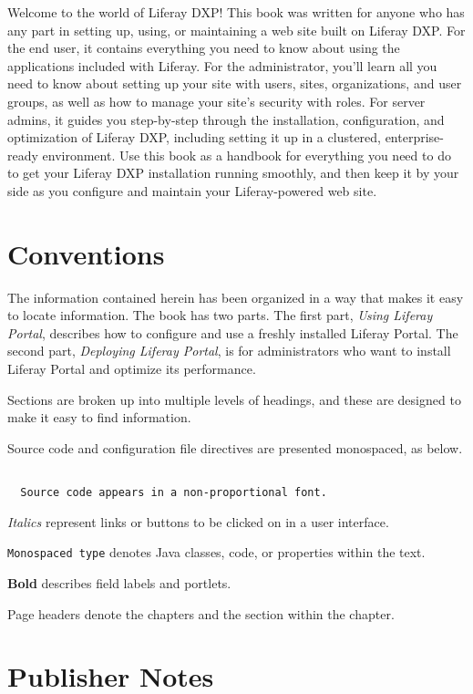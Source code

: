 \documentclass[11pt,openright,twoside]{memoir}
\begin{document}
Welcome to the world of Liferay DXP! This book was written for anyone who has
any part in setting up, using, or maintaining a web site built on Liferay
DXP. For the end user, it contains everything you need to know about using
the applications included with Liferay. For the administrator, you'll learn all
you need to know about setting up your site with users, sites, organizations,
and user groups, as well as how to manage your site's security with roles. For
server admins, it guides you step-by-step through the installation,
configuration, and optimization of Liferay DXP, including setting it up in a
clustered, enterprise-ready environment. Use this book as a handbook for
everything you need to do to get your Liferay DXP installation running
smoothly, and then keep it by your side as you configure and maintain your
Liferay-powered web site.

\section{Conventions}

The information contained herein has been organized in a way that makes it easy
to locate information. The book has two parts. The first part, 
\textit{Using Liferay Portal}, describes how to configure and use a freshly 
installed Liferay Portal. The second part, \textit{Deploying Liferay Portal}, 
is for administrators who want to install Liferay Portal and optimize its 
performance. 

Sections are broken up into multiple levels of headings, and these are
designed to make it easy to find information.

Source code and configuration file directives are presented monospaced, as
below.

\begin{verbatim}

  Source code appears in a non-proportional font. 

\end{verbatim}

\textit{Italics} represent links or buttons to be clicked on in a user interface.

\texttt{Monospaced type} denotes Java classes, code, or properties within the text.

\textbf{Bold} describes field labels and portlets.

Page headers denote the chapters and the section within the chapter.

\section{Publisher Notes}
\end{document}
